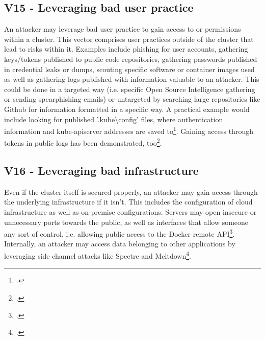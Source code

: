 \subsection{V15 - Leveraging bad user practice}
An attacker may leverage bad user practice to gain access to or permissions within a cluster. 
This vector comprises user practices outside of the cluster that lead to risks within it.
Examples include phishing for user accounts, gathering keys/tokens published to public code repositories, gathering passwords published in credential leaks or dumps, scouting specific software or container images used as well as gathering logs published with information valuable to an attacker.
This could be done in a targeted way (i.e. specific Open Source Intelligence gathering or sending spearphishing emails) or untargeted by searching large repositories like Github for information formatted in a specific way. A practical example would include looking for published '.kube\textbackslash config' files, where authentication information and kube-apiserver addresses are saved to\footcite[][, section 'Define clusters, users, and contexts']{kubectlClusterAccess}. Gaining access through tokens in public logs has been demonstrated, too\footcite[][, section 'Results and notable findings']{ciKnew}.


\subsection{V16 - Leveraging bad infrastructure} \label{v16}
Even if the cluster itself is secured properly, an attacker may gain access through the underlying infrastructure if it isn't.
This includes the configuration of cloud infrastructure as well as on-premise configurations.
Servers may open insecure or unnecessary ports towards the public, as well as interfaces that allow someone any sort of control, i.e. allowing public access to the Docker remote API\footcite[][, section 'Publicly Accessible Docker Hosts']{dockerRemoteAccess}.
Internally, an attacker may access data belonging to other applications by leveraging side channel attacks like Spectre and Meltdown\footcite[][, section 'Which cloud providers are affected by Meltdown?']{spectreMeltdown}.


